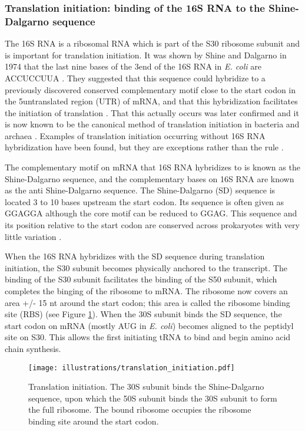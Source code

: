 \subsubsection{Translation initiation: binding of the 16S RNA to the
Shine-Dalgarno sequence}
The 16S RNA is a ribosomal RNA which is part of the S30 ribosome subunit and is
important for translation initiation. It was shown by Shine and Dalgarno in
1974 that the last nine bases of the 3\ppp end of the 16S RNA in \textit{E.
coli} are ACCUCCUUA \cite{shine_3-terminal_1974}. They suggested that this
sequence could hybridize to a previously discovered conserved complementary
motif close to the start codon in the 5\ppp untranslated region (UTR) of mRNA,
and that this hybridization facilitates the initiation of translation
\cite{shine_3-terminal_1974}. That this actually occurs was later confirmed and
it is now known to be the canonical method of translation initiation in
bacteria and archaea \cite{nakagawa_dynamic_2010}. Examples of
translation initiation occurring without 16S RNA hybridization have been found,
but they are exceptions rather than the rule \cite{skorski_highly_2006,
boni_non-canonical_2001}.

The complementary motif on mRNA that 16S RNA hybridizes to is known as the
Shine-Dalgarno sequence, and the complementary bases on 16S RNA are known as the
anti Shine-Dalgarno sequence. The Shine-Dalgarno (SD) sequence is located 3 to
10 bases upstream the start codon. Its sequence is often given as GGAGGA
although the core motif can be reduced to GGAG. This sequence and its position
relative to the start codon are conserved across prokaryotes with very little
variation \cite{nakagawa_dynamic_2010}. 

When the 16S RNA hybridizes with the SD sequence during translation initiation,
the S30 subunit becomes physically anchored to the transcript. The binding of
the S30 subunit facilitates the binding of the S50 subunit, which completes the
binging of the ribosome to mRNA. The ribosome now covers an area +/- 15 nt
around the start codon; this area is called the ribosome binding site (RBS)
\cite{kozak_regulation_2005} (see Figure \ref{fig:translation_initiation}).
When the 30S subunit binds the SD sequence, the start codon on mRNA (mostly AUG
in \textit{E. coli}) becomes aligned to the peptidyl site on S30. This allows
the first initiating tRNA to bind and begin amino acid chain synthesis.
\begin{figure}[htb]
	\begin{center}
		\texttt{[image: illustrations/translation\_initiation.pdf]}
	\end{center}
	\caption{Translation initiation. The 30S subunit binds the Shine-Dalgarno
	sequence, upon which the 50S subunit binds the 30S subunit to form the full
	ribosome. The bound ribosome occupies the ribosome binding site around the
	start codon.}
	\label{fig:translation_initiation}
\end{figure}

